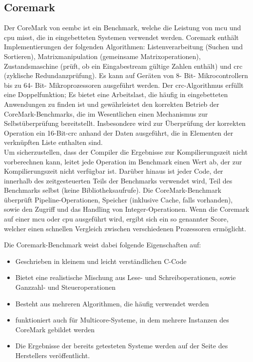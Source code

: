   \subsection{Coremark}\label{kap:coremark}
  Der CoreMark von \ac{eembc} ist ein Benchmark, welche die Leistung von \ac{mcu} und \ac{cpu} misst, die in eingebetteten Systemen verwendet werden.
  \newpage
   Coremark enthält Implementierungen der folgenden Algorithmen: Listenverarbeitung (Suchen und Sortieren),
    Matrixmanipulation (gemeinsame Matrixoperationen), Zustandsmaschine (prüft, ob ein Eingabestream gültige Zahlen enthält) und \ac{crc} (zyklische Redundanzprüfung).
    Es kann auf Geräten von 8- Bit- Mikrocontrollern bis zu 64- Bit- Mikroprozessoren ausgeführt werden.
  Der \ac{crc}-Algorithmus erfüllt eine Doppelfunktion; Es bietet eine Arbeitslast, die häufig in eingebetteten Anwendungen zu finden ist
  und gewährleistet den korrekten Betrieb der CoreMark-Benchmarks, die im Wesentlichen einen Mechanismus zur Selbstüberprüfung bereitstellt.
   Insbesondere wird zur Überprüfung der korrekten Operation ein 16-Bit-\ac{crc} anhand der Daten ausgeführt, die in Elementen der verknüpften Liste enthalten sind.\\
  Um sicherzustellen, dass der Compiler die Ergebnisse zur Kompilierungszeit nicht vorberechnen kann, leitet jede Operation im Benchmark einen Wert ab,
  der zur Kompilierungszeit nicht verfügbar ist. Darüber hinaus ist jeder Code, der innerhalb des zeitgesteuerten Teils der Benchmarks verwendet wird,
  Teil des Benchmarks selbst (keine Bibliotheksaufrufe).
  Die CoreMark-Benchmark überprüft Pipeline-Operationen, Speicher (inklusive Cache, falls vorhanden), sowie den Zugriff und das Handling von Integer-Operationen.
  Wenn die Coremark auf einer \ac{mcu} oder \ac{cpu} ausgeführt wird, ergibt sich ein so genannter Score, welcher einen schnellen Vergleich zwischen verschiedenen Prozessoren ermöglicht.~\cite{coremark}


  Die Coremark-Benchmark weist dabei folgende Eigenschaften auf:
\begin{itemize}
  \item Geschrieben in kleinem und leicht verständlichen C-Code
  \item Bietet eine realistische Mischung aus Lese- und Schreiboperationen, sowie Ganzzahl- und Steueroperationen
  \item Besteht aus mehreren Algorithmen, die häufig verwendet werden
  \item funktioniert auch für Multicore-Systeme, in dem mehrere Instanzen des CoreMark gebildet werden
  \item Die Ergebnisse der bereits getesteten Systeme werden auf der Seite des Herstellers veröffentlicht.
\end{itemize}

